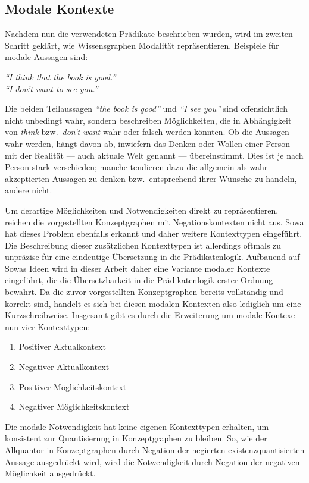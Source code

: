 \subsection{Modale Kontexte}%
\label{sec:text2kg:ontology:modal}

Nachdem nun die verwendeten Prädikate beschrieben wurden, wird im zweiten Schritt geklärt, wie Wissensgraphen Modalität repräsentieren.
Beispiele für modale Aussagen sind:
\begin{center}
	\textit{``I {\color{blau}think} that {\color{rot}the book is good}.''}\\
	\textit{``{\color{rot}I} {\color{blau}don't want} to {\color{rot}see you}.''}
\end{center}
Die beiden Teilaussagen \textit{\color{rot}``the book is good''} und \textit{\color{rot}``I see you''} sind offensichtlich nicht unbedingt wahr, sondern beschreiben Möglichkeiten, die in Abhängigkeit von \textit{\color{blau}think} bzw.\ \textit{\color{blau}don't want} wahr oder falsch werden könnten.
Ob die Aussagen wahr werden, hängt davon ab, inwiefern das Denken oder Wollen einer Person mit der Realität --- auch aktuale Welt genannt --- übereinstimmt.
Dies ist je nach Person stark verschieden; manche tendieren dazu die allgemein als wahr akzeptierten Aussagen zu denken bzw.\ entsprechend ihrer Wünsche zu handeln, andere nicht.

Um derartige Möglichkeiten und Notwendigkeiten direkt zu repräsentieren, reichen die vorgestellten Konzeptgraphen mit Negationskontexten nicht aus.
Sowa hat dieses Problem ebenfalls erkannt und daher weitere Kontexttypen eingeführt.
Die Beschreibung dieser zusätzlichen Kontexttypen ist allerdings oftmals zu unpräzise für eine eindeutige Übersetzung in die Prädikatenlogik.
Aufbauend auf Sowas Ideen wird in dieser Arbeit daher eine Variante modaler Kontexte eingeführt, die die Übersetzbarkeit in die Prädikatenlogik erster Ordnung bewahrt.
Da die zuvor vorgestellten Konzeptgraphen bereits vollständig und korrekt sind, handelt es sich bei diesen modalen Kontexten also lediglich um eine Kurzschreibweise.
Insgesamt gibt es durch die Erweiterung um modale Kontexe nun vier Kontexttypen:
\begin{multicols}{2}
	\flushleft\begin{enumerate}
		\item Positiver Aktualkontext
		\item Negativer Aktualkontext
		\item Positiver Möglichkeitskontext
		\item Negativer Möglichkeitskontext
	\end{enumerate}
\end{multicols}
Die modale Notwendigkeit hat keine eigenen Kontexttypen erhalten, um konsistent zur Quantisierung in Konzeptgraphen zu bleiben.
So, wie der Allquantor in Konzeptgraphen durch Negation der negierten existenzquantisierten Aussage ausgedrückt wird, wird die Notwendigkeit durch Negation der negativen Möglichkeit ausgedrückt.

